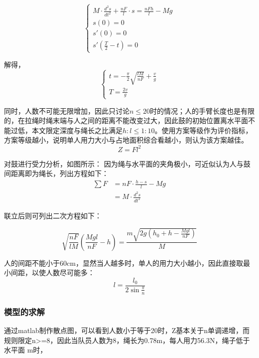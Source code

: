 \documentclass[withoutpreface,bwprint]{cumcmthesis} %
\begin{document}
\begin{equation}
\begin{cases}
     M\cdot\frac{d^{2}s}{dt^{2}}+\frac{nF}{l}\cdot s = \frac{nFh}{l}-Mg \\
	    s\left ( 0\right )=0 \\
       s'\left ( 0 \right )=0 \\
s'(\frac{T}{2}-t)=0
\end{cases}
\end{equation}
\par
解得，
\begin{equation}
\begin{cases}
    t=-\frac{\pi}{2}\sqrt{\frac{lM}{nF}}+\frac{v}{g}\\
	T=\frac{2v}{g}
\end{cases}
\end{equation}


\par
同时，人数不可能无限增加，因此只讨论$n\leq 20$时的情况；人的手臂长度也是有限的，在拉绳时绳末端与人之间的距离不能改变过大，因此鼓的初始位置离水平面不能过低，本文限定深度与绳长之比满足$h:l\leq 1:10$。使用方案等级作为评价指标，方案等级越小，说明单人用力大小与占地面积综合看越小，则认为该方案越佳。
\begin{equation}
Z=Fl^2
\end{equation}

\par
对鼓进行受力分析，如图所示：
因为绳与水平面的夹角极小，可近似认为人与鼓间距离即为绳长，列出方程如下：
\begin{align}
\sum F  &= n F\cdot \frac{h-s}{l}-M g \\
 &=M\cdot \frac{d^{2}s}{dt^{2}}
\label{1}
\end{align}


联立后则可列出二次方程如下：

\begin{equation}
\sqrt{\frac{nF}{lM}}\left ( \frac{Mgl}{nF}-h \right )=\frac{m\sqrt{2g\left ( h_0+h-\frac{Mgl}{nF} \right )}}{M}
\end{equation}

人的间距不能小于60cm，显然当人越多时，单人的用力大小越小，因此直接取最小间距，以使人数尽可能多：
\begin{equation}
l=\frac{l_0}{2\sin\frac{\pi}{n}}
\end{equation}
	\subsubsection{模型的求解}
通过matlab制作散点图，可以看到人数小于等于20时，Z基本关于n单调递增，而规则限定n>=8，因此当队员人数为8，绳长为0.78m，每人用力56.3N，绳子低于水平面 m时，
\end{document}
